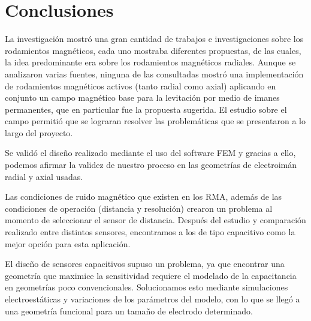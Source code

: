 \chapter{Conclusiones}


La investigaci\'on mostr\'o una gran cantidad de trabajos e investigaciones sobre los rodamientos magn\'eticos,  cada uno mostraba diferentes propuestas, de las cuales, la idea predominante era sobre los rodamientos magn\'eticos radiales. Aunque se analizaron varias fuentes, ninguna de las consultadas mostr\'o una implementaci\'on de rodamientos magn\'eticos activos (tanto radial como axial) aplicando en conjunto un campo magn\'etico base para la levitaci\'on por medio de imanes permanentes, que en particular fue la propuesta sugerida. El estudio sobre el campo permiti\'o que se lograran resolver las problem\'aticas que se presentaron a lo largo del proyecto. 

Se valid\'o el dise\~no realizado mediante el uso del software FEM y gracias a ello, podemos afirmar la validez de nuestro proceso en las geometr\'ias de electroim\'an radial y axial usadas.

Las condiciones de ruido magn\'etico que existen en los RMA, adem\'as de las condiciones de operaci\'on (distancia y resoluci\'on) crearon un problema al momento de seleccionar el sensor de distancia. Despu\'es del estudio y comparaci\'on realizado entre distintos sensores, encontramos a los de tipo capacitivo como la mejor opci\'on para esta aplicaci\'on.

El dise\~no de sensores capacitivos supuso un problema, ya que encontrar una geometr\'ia que maximice la sensitividad requiere el modelado de la capacitancia en geometr\'ias poco convencionales. Solucionamos esto mediante simulaciones electroest\'aticas y variaciones de los par\'ametros del modelo, con lo que se lleg\'o a una geometr\'ia funcional para un tama\~no de electrodo determinado.

